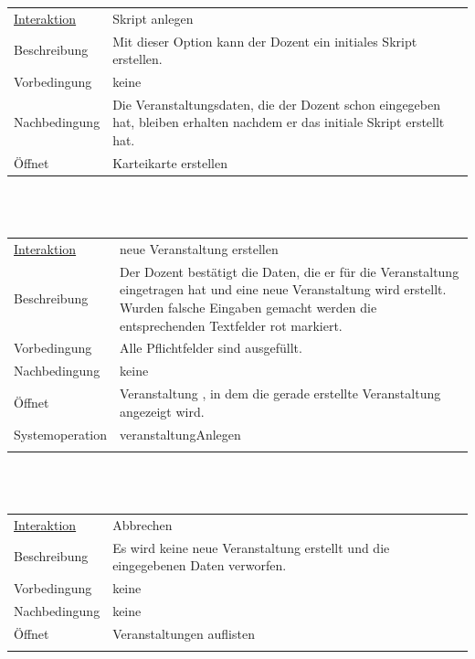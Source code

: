 \documentclass[12pt,a4paper]{article}
\begin{document}
{\begin{tabular}{l p{12cm}}
\underline{Interaktion}  	 & Skript anlegen\\ 
Beschreibung   	 & Mit dieser Option kann der Dozent ein initiales Skript erstellen.\\
Vorbedingung   	 & keine\\
Nachbedingung 	 & Die Veranstaltungsdaten, die der Dozent schon eingegeben hat, bleiben erhalten nachdem er das initiale Skript erstellt hat.\\
Öffnet			 & \glqq Karteikarte erstellen\grqq \\
\end{tabular}\\\\

\begin{tabular}{l p{12cm}}
\underline{Interaktion}  	 & neue Veranstaltung erstellen\\ 
Beschreibung   	 & Der Dozent bestätigt die Daten, die er für die Veranstaltung eingetragen hat und eine neue Veranstaltung wird erstellt. Wurden falsche Eingaben gemacht werden die entsprechenden Textfelder rot markiert. \\
Vorbedingung   	 & Alle Pflichtfelder sind ausgefüllt.\\
Nachbedingung	 & keine\\
Öffnet			 & \glqq Veranstaltung \grqq, in dem die gerade erstellte Veranstaltung angezeigt wird. \\
Systemoperation & veranstaltungAnlegen\\\\
\end{tabular}\\\\

\begin{tabular}{l p{12cm}}
\underline{Interaktion}  	 & Abbrechen\\ 
Beschreibung   	 & Es wird keine neue Veranstaltung erstellt und die eingegebenen Daten verworfen.  \\
Vorbedingung	 & keine \\
Nachbedingung	 & keine \\
Öffnet			 & \glqq Veranstaltungen auflisten\grqq \\\\
\end{tabular}\\\\

\begin{figure}[H]
	\centering

\end{figure}}
\end{document}
